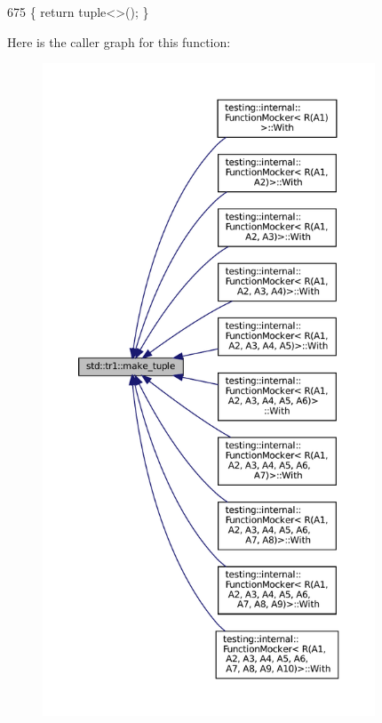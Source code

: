 \begin{DoxyCode}
675 \{ \textcolor{keywordflow}{return} tuple<>(); \}
\end{DoxyCode}
Here is the caller graph for this function\+:
\nopagebreak
\begin{figure}[H]
\begin{center}
\leavevmode
\includegraphics[height=550pt]{namespacestd_1_1tr1_af7e12a0f5b5791b5b7c49a5a17b85359_icgraph}
\end{center}
\end{figure}
\mbox{\label{namespacestd_1_1tr1_a058882c51de469b5e78d29076f864940}} 
